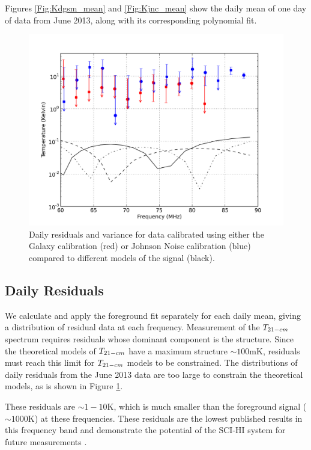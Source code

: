 Figures \ref{Fig:Kdgsm_mean} and \ref{Fig:Kjnc_mean} show the daily mean of one day of data from June 2013, along with its corresponding polynomial fit. 

\begin{figure}[htb]
\begin{center}
\includegraphics[width=0.95\linewidth]{Data_analysis/figures/joint_log_means.png}
\caption{Daily residuals and variance for data calibrated using either the Galaxy calibration (red) or Johnson Noise calibration (blue) compared to different models of the \cm signal (black). }
\label{Fig:resid}
\end{center}
\end{figure}


\subsection{Daily Residuals}

We calculate and apply the foreground fit separately for each daily mean, giving a distribution of residual data at each frequency. Measurement of the $T_{21-cm}$ spectrum requires residuals whose dominant component is the \cm structure. Since the theoretical models of $T_{21-cm}$ have a maximum structure $\sim 100 $mK, residuals must reach this limit for $T_{21-cm}$ models to be constrained. The distributions of daily residuals from the June 2013 data are too large to constrain the theoretical models, as is shown in Figure \ref{Fig:resid}. 

These residuals are $\sim 1-10$K, which is much smaller than the foreground signal ($\sim 1000$K) at these frequencies. These residuals are the lowest published results in this frequency band and demonstrate the potential of the SCI-HI system for future measurements \cite{Voytek_2014}. 


